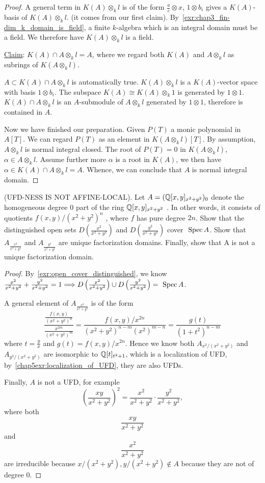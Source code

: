 \documentclass[11pt]{book} %
\begin{document}
\begin{proof}
A general term in $K(A)\otimes_k l$ is of the form $\frac{a}{c}\otimes x$, $1\otimes b_i$ gives a $K(A)$-basis of $K(A)\otimes_k l$. (it comes from our first claim). By~\ref{exr:chap3_fin-dim_k_domain_is_field}, a finite $k$-algebra which is an integral domain must be a field. We therefore have $K(A)\otimes_k l$ is a  field. 

\underline{Claim}: $K(A)\cap A\otimes_k l=A$, where we regard both $K(A)$ and $A\otimes_k l$ as subrings of $K(A\otimes_k l)$.

$A\subset K(A)\cap A\otimes_k l$ is automatically true. $K(A)\otimes_k l$ is a $K(A)$-vector space with basis $1\otimes b_i$. The subspace $K(A)\cong K(A)\otimes_k 1$ is generated by $1\otimes 1$. $K(A)\cap A\otimes_k l$ is an $A$-submodule of $A\otimes_k l$ generated by $1\otimes 1$, therefore is contained in $A$.

Now we have finished our preparation. Given $P(T)$ a monic polynomial in $A[T]$. We can regard $P(T)$ as an element in $K(A\otimes_k l)[T]$. By assumption, $A\otimes_k l$ is normal integral closed. The root of $P(T)=0$ in $K(A\otimes_k l)$, $\alpha\in A\otimes_k l$. Assume further more $\alpha$ is a root in $K(A)$, we then have $\alpha\in K(A)\cap A\otimes_k l=A$. Whence, we can conclude that $A$ is normal integral domain. 

\end{proof}
\begin{exr}
(UFD-NESS IS NOT AFFINE-LOCAL). Let $A = (\mathbb Q[x, y]_{x^2+y^2})_0$ denote the homogeneous degree $0$ part of the ring $\mathbb Q[x,y]_{x^2 +y^2}$ . In other words, it consists of quotients $f(x, y)/(x^2 + y^2)^n$ , where $f$ has pure degree $2n$. Show that the distinguished open sets $D\left( \frac{x^2}{x^2+y^2}\right)$ and $D\left( \frac{y^2}{x^2+y^2}\right)$ cover $\text{ Spec\,} A$. Show that $A_{\frac{x^2}{x^2+y^2}}$ and $A_{\frac{y^2}{x^2+y^2}}$
are unique factorization domains. Finally, show that A is not a unique factorization domain.
\end{exr}
\begin{proof}
By~\ref{exr:open_cover_distinguished}, we know 
$ \frac{x^2}{x^2+y^2}+ \frac{y^2}{x^2+y^2}=1\Longrightarrow D\left( \frac{x^2}{x^2+y^2}\right)\cup D\left( \frac{y^2}{x^2+y^2}\right)=\text{ Spec\,} A$.

A general element of $A_{\frac{x^2}{x^2+y^2}}$ is of the form
$$
\frac{\frac{f(x,y)}{(x^2+y^2)^n}}{\frac{x^{2m}}{(x^2+y^2)^m}}=\frac{f(x,y)/x^{2n}}{(x^2+y^2)^{n-m} (x^{2})^{m-n}}=\frac{g(t)}{(1+t^2)^{n-m}}
$$
where $t=\frac{y}{x}$ and $g(t)=f(x,y)/x^{2n}$. Hence we know both $A_{x^2/(x^2+y^2)}$ and $A_{y^2/(x^2+y^2)}$ are isomorphic to $\mathbb Q[t]_{t^2+1}$, which is a localization of UFD, by~\ref{chap5exr:localization_of_UFD}, they are also UFDs.

Finally, $A$ is not a UFD, for example
$$
\left(\frac{xy}{x^2+y^2}\right)^2=\frac{x^2}{x^2+y^2}\cdot \frac{y^2}{x^2+y^2},
$$
where both 
$$
\frac{xy}{x^2+y^2}
$$
and
$$
\frac{x^2}{x^2+y^2}
$$
are irreducible because $x/(x^2+y^2),y/(x^2+y^2)\notin A$ because they are not of degree $0$.
\end{proof}
\end{document}
